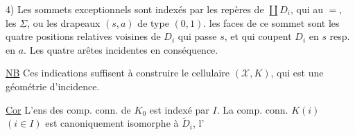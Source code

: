 4) Les sommets exceptionnels sont indexés par les repères de $\coprod D_i$,   qui  au $=$, les    $\underline\Sigma$,  ou les drapeaux $(s,a)$ de type $(0,1)$.  les  faces  de ce sommet sont les quatre positions relatives voisines de $D_i$  qui passe $s$, et qui  coupent $D_i$ en $s$ resp. en $a$. Les quatre arêtes incidentes en conséquence.

\uline{NB} Ces indications suffisent à construire le  cellulaire $(\mathcal X,K)$, qui est une géométrie d'incidence.

\uline{Cor} L'ens des comp. conn. de $K_0$ est indexé par $I$. La  comp. conn. $K(i)$ $(i\in I)$ est canoniquement isomorphe à  $\widetilde D_i$, l'

